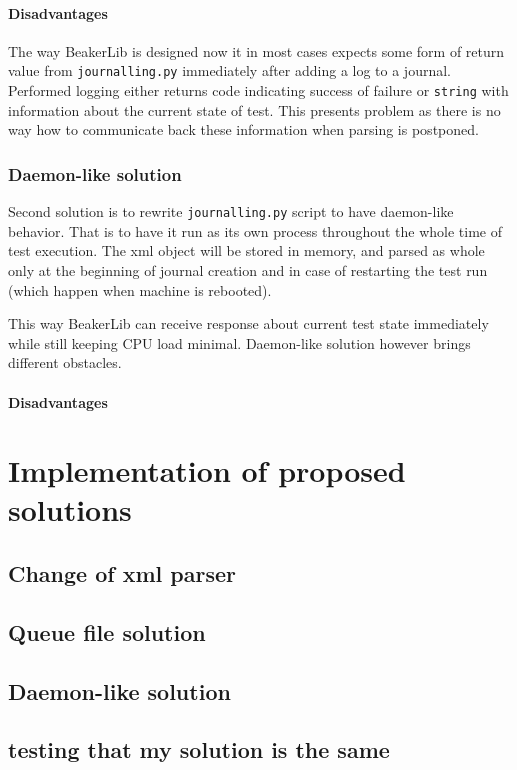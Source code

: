 \subsubsection{Disadvantages}
The way BeakerLib is designed now it in most cases expects some form of return value from \texttt{journalling.py} immediately after adding a log to a journal. Performed logging either returns code indicating success of failure or \texttt{string} with information about the current state of test. This presents problem as there is no way how to communicate back these information when parsing is postponed. 

\subsection{Daemon-like solution}
Second solution is to rewrite \texttt{journalling.py} script to have daemon-like behavior. That is to have it run as its own process throughout the whole time of test execution. The xml object will be stored in memory, and parsed as whole only at the beginning of journal creation and in case of restarting the test run (which happen when machine is rebooted).  

This way BeakerLib can receive response about current test state immediately while still keeping CPU load minimal. Daemon-like solution however brings different obstacles.

\subsubsection{Disadvantages}




\chapter{Implementation of proposed solutions}

\section{Change of xml parser}
\section{Queue file solution}
\section{Daemon-like solution}

\section{testing that my solution is the same}

